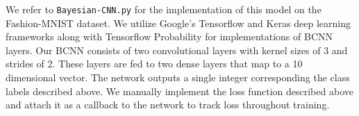 We refer to \texttt{Bayesian-CNN.py} for the implementation of this model on the Fashion-MNIST dataset. We utilize Google's Tensorflow and Keras deep learning frameworks along with Tensorflow Probability for implementations of BCNN layers. Our BCNN consists of two convolutional layers with kernel sizes of 3 and strides of 2. These layers are fed to two dense layers that map to a 10 dimensional vector. The network outputs a single integer corresponding the class labels described above. We manually implement the loss function described above and attach it as a callback to the network to track loss throughout training.